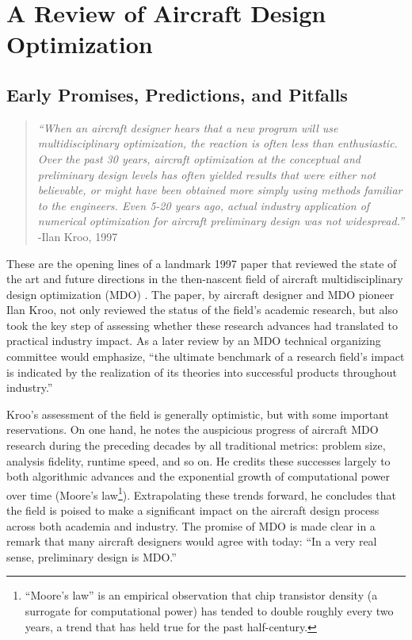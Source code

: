 \documentclass[12pt,vi,oneside]{report}
\begin{document}
    \chapter{A Review of Aircraft Design Optimization}
    \label{sec:literature}


    \section{Early Promises, Predictions, and Pitfalls}

    \begin{quote}
        \textit{``When an aircraft designer hears that a new program will use multidisciplinary optimization, the reaction is often less than enthusiastic. Over the past 30 years, aircraft optimization at the conceptual and preliminary design levels has often yielded results that were either not believable, or might have been obtained more simply using methods familiar to the engineers. Even 5-20 years ago, actual industry application of numerical optimization for aircraft preliminary design was not widespread.''}
        \flushright-Ilan Kroo, 1997 \cite{kroo_multidisciplinary_1997}
    \end{quote}

    These are the opening lines of a landmark 1997 paper that reviewed the state of the art and future directions in the then-nascent field of aircraft multidisciplinary design optimization (MDO) \cite{kroo_multidisciplinary_1997}. The paper, by aircraft designer and MDO pioneer Ilan Kroo, not only reviewed the status of the field's academic research, but also took the key step of assessing whether these research advances had translated to practical industry impact. As a later review by an MDO technical organizing committee would emphasize, ``the ultimate benchmark of a research field's impact is indicated by the realization of its theories into successful products throughout industry.'' \cite{agte_mdo_2010}

    Kroo's assessment of the field is generally optimistic, but with some important reservations. On one hand, he notes the auspicious progress of aircraft MDO research during the preceding decades by all traditional metrics: problem size, analysis fidelity, runtime speed, and so on. He credits these successes largely to both algorithmic advances and the exponential growth of computational power over time (Moore's law\footnote{``Moore's law'' is an empirical observation that chip transistor density (a surrogate for computational power) has tended to double roughly every two years, a trend that has held true for the past half-century.}). Extrapolating these trends forward, he concludes that the field is poised to make a significant impact on the aircraft design process across both academia and industry. The promise of MDO is made clear in a remark that many aircraft designers would agree with today: ``In a very real sense, preliminary design is MDO.'' \cite{kroo_multidisciplinary_1997}
\end{document}
